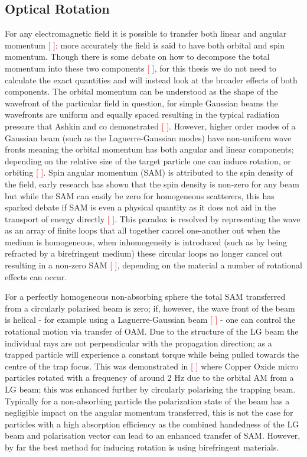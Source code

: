 \documentclass[a4paper,oneside,11pt]{book}
\begin{document}
\subsection{Optical Rotation}
For any electromagnetic field it is possible to transfer both linear and angular momentum \textcolor{red}{[ ]}; more accurately the field is said to have both orbital and spin momentum. Though there is some debate on how to decompose the total momentum into these two components \textcolor{red}{[ ]}, for this thesis we do not need to calculate the exact quantities and will instead look at the broader effects of both components. The orbital momentum can be understood as the shape of the wavefront of the particular field in question, for simple Gaussian beams the wavefronts are uniform and equally spaced resulting in the typical radiation pressure that Ashkin and co demonstrated \textcolor{red}{[ ]}. However, higher order modes of a Gaussian beam (such as the Laguerre-Gaussian modes) have non-uniform wave fronts meaning the orbital momentum has both angular and linear components; depending on the relative size of the target particle one can induce rotation, or orbiting \textcolor{red}{[ ]}. Spin angular momentum (SAM) is attributed to the spin density of the field, early research has shown that the spin density is non-zero for any beam but while the SAM can easily be zero for homogeneous scatterers, this has sparked debate if SAM is even a physical quantity as it does not aid in the transport of energy directly \textcolor{red}{[ ]}. This paradox is resolved by representing the wave as an array of finite loops that all together cancel one-another out when the medium is homogeneous, when inhomogeneity is introduced (such as by being refracted by a birefringent medium) these circular loops no longer cancel out resulting in a non-zero SAM \textcolor{red}{[ ]}, depending on the material a number of rotational effects can occur. 

For a perfectly homogeneous non-absorbing sphere the total SAM transferred from a circularly polarised beam is zero; if, however, the wave front of the beam is helical - for example using a Laguerre-Gaussian beam \textcolor{red}{[ ]} - one can control the rotational motion via transfer of OAM. Due to the structure of the LG beam the individual rays are not perpendicular with the propagation direction; as a trapped particle will experience a constant torque while being pulled towards the centre of the trap focus. This was demonstrated in \textcolor{red}{[ ]} where Copper Oxide micro particles rotated with a frequency of around 2 Hz due to the orbital AM from a LG beam; this was enhanced further by circularly polarising the trapping beam. Typically for a non-absorbing particle the polarization state of the beam has a negligible impact on the angular momentum transferred, this is not the case for particles with a high absorption efficiency as the combined handedness of the LG beam and polarisation vector can lead to an enhanced transfer of SAM. However, by far the best method for inducing rotation is using birefringent materials.
\end{document}
